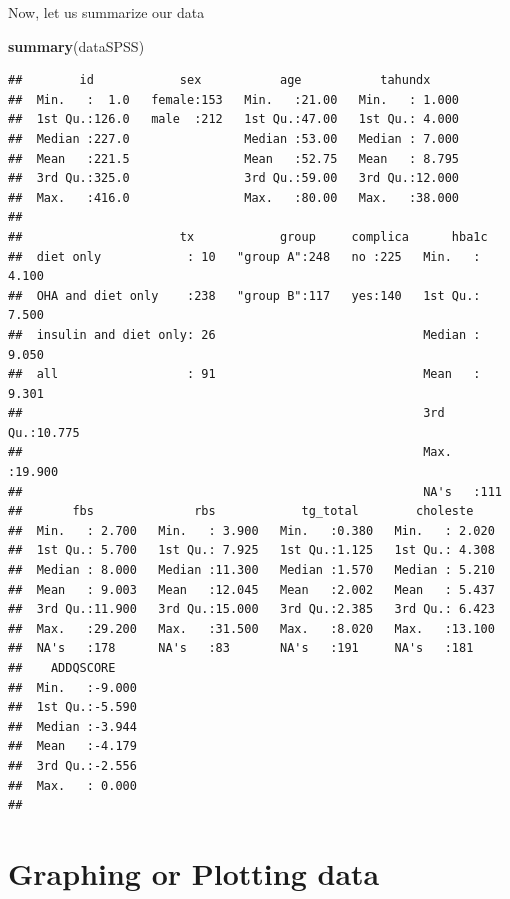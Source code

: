 \documentclass[]{book}
\newenvironment{Shaded}{\begin{snugshade}}{\end{snugshade}}
\newcommand{\KeywordTok}[1]{\textcolor[rgb]{0.13,0.29,0.53}{\textbf{#1}}}
\newcommand{\NormalTok}[1]{#1}
\theoremstyle{definition}
\theoremstyle{definition}
\theoremstyle{remark}
\begin{document}
Now, let us summarize our data

\begin{Shaded}
\begin{Highlighting}[]
\KeywordTok{summary}\NormalTok{(dataSPSS)}
\end{Highlighting}
\end{Shaded}

\begin{verbatim}
##        id            sex           age           tahundx      
##  Min.   :  1.0   female:153   Min.   :21.00   Min.   : 1.000  
##  1st Qu.:126.0   male  :212   1st Qu.:47.00   1st Qu.: 4.000  
##  Median :227.0                Median :53.00   Median : 7.000  
##  Mean   :221.5                Mean   :52.75   Mean   : 8.795  
##  3rd Qu.:325.0                3rd Qu.:59.00   3rd Qu.:12.000  
##  Max.   :416.0                Max.   :80.00   Max.   :38.000  
##                                                               
##                      tx            group     complica      hba1c       
##  diet only            : 10   "group A":248   no :225   Min.   : 4.100  
##  OHA and diet only    :238   "group B":117   yes:140   1st Qu.: 7.500  
##  insulin and diet only: 26                             Median : 9.050  
##  all                  : 91                             Mean   : 9.301  
##                                                        3rd Qu.:10.775  
##                                                        Max.   :19.900  
##                                                        NA's   :111     
##       fbs              rbs            tg_total        choleste     
##  Min.   : 2.700   Min.   : 3.900   Min.   :0.380   Min.   : 2.020  
##  1st Qu.: 5.700   1st Qu.: 7.925   1st Qu.:1.125   1st Qu.: 4.308  
##  Median : 8.000   Median :11.300   Median :1.570   Median : 5.210  
##  Mean   : 9.003   Mean   :12.045   Mean   :2.002   Mean   : 5.437  
##  3rd Qu.:11.900   3rd Qu.:15.000   3rd Qu.:2.385   3rd Qu.: 6.423  
##  Max.   :29.200   Max.   :31.500   Max.   :8.020   Max.   :13.100  
##  NA's   :178      NA's   :83       NA's   :191     NA's   :181     
##    ADDQSCORE     
##  Min.   :-9.000  
##  1st Qu.:-5.590  
##  Median :-3.944  
##  Mean   :-4.179  
##  3rd Qu.:-2.556  
##  Max.   : 0.000  
## 
\end{verbatim}

\section{Graphing or Plotting data}\label{graphing-or-plotting-data}
\end{document}
